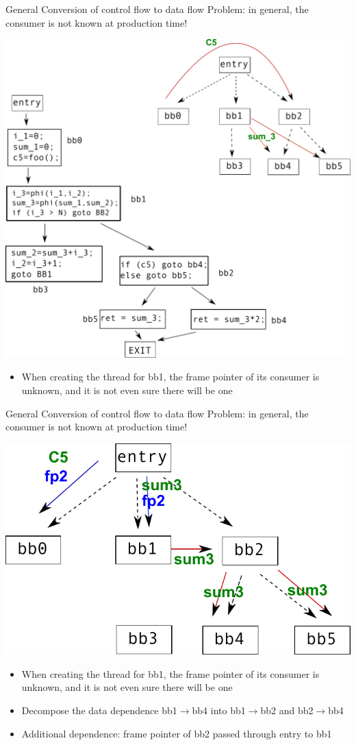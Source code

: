 \documentclass[xcolor=dvipsnames,9pt,mathserif]{beamer}
\begin{document}
\begin{frame}[t]{General Conversion of control flow to data flow}
  Problem: in general, the consumer is not known at production time!

  \medskip
  \includegraphics[width=.6\columnwidth]{cdg4.pdf}

  \begin{itemize}
  \item When creating the thread for bb1, the frame pointer of its
    consumer is unknown, and it is not even sure there will be one
  \end{itemize}
\end{frame}

\begin{frame}[t]{General Conversion of control flow to data flow}
  Problem: in general, the consumer is not known at production time!

  \medskip
  \begin{minipage}{.40\textwidth}
    \includegraphics[width=.98\columnwidth]{cdg5.pdf}
  \end{minipage}
  \hfill
  \begin{minipage}{.50\textwidth}  
    \begin{itemize}
    \item When creating the thread for bb1, the frame pointer of its
      consumer is unknown, and it is not even sure there will be one
    \item Decompose the data dependence bb1$\to$bb4 into
      bb1$\to$bb2 and bb2$\to$bb4
    \item Additional dependence: frame pointer of bb2 passed through
      entry to bb1
    \end{itemize}
  \end{minipage}
\end{frame}
\end{document}
